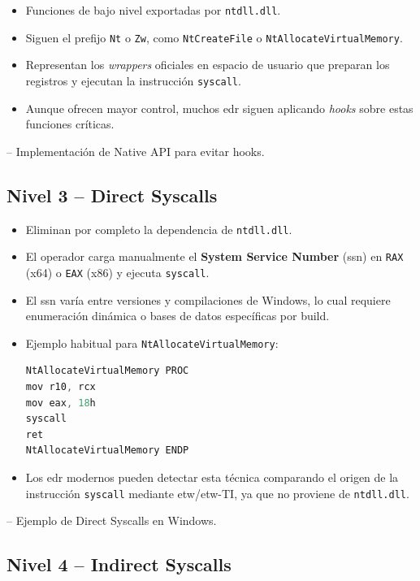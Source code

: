 \begin{itemize}
\item Funciones de bajo nivel exportadas por \texttt{ntdll.dll}.
\item Siguen el prefijo \texttt{Nt} o \texttt{Zw}, como \texttt{NtCreateFile} o \texttt{NtAllocateVirtualMemory}.
\item Representan los \textit{wrappers} oficiales en espacio de usuario que preparan los registros y ejecutan la instrucción \texttt{syscall}.
\item Aunque ofrecen mayor control, muchos \acrshort{edr} siguen aplicando \textit{hooks} sobre estas funciones críticas.
\end{itemize}

\cite{ref:nativeapi} – Implementación de Native API para evitar hooks.  

\subsection{Nivel 3 – Direct Syscalls}

\begin{itemize}
\item Eliminan por completo la dependencia de \texttt{ntdll.dll}.
\item El operador carga manualmente el \textbf{System Service Number} (\acrshort{ssn}) en \texttt{RAX} (x64) o \texttt{EAX} (x86) y ejecuta \texttt{syscall}.
\item El \acrshort{ssn} varía entre versiones y compilaciones de Windows, lo cual requiere enumeración dinámica o bases de datos específicas por build.
\item Ejemplo habitual para \texttt{NtAllocateVirtualMemory}:
\begin{lstlisting}[language=C]
NtAllocateVirtualMemory PROC
mov r10, rcx
mov eax, 18h
syscall
ret
NtAllocateVirtualMemory ENDP
\end{lstlisting}
\item Los \acrshort{edr} modernos pueden detectar esta técnica comparando el origen de la instrucción \texttt{syscall} mediante \acrshort{etw}/\acrshort{etw}-TI, ya que no proviene de \texttt{ntdll.dll}.
\end{itemize}

\cite{ref:directsyscalls} – Ejemplo de Direct Syscalls en Windows.  

\subsection{Nivel 4 – Indirect Syscalls}

